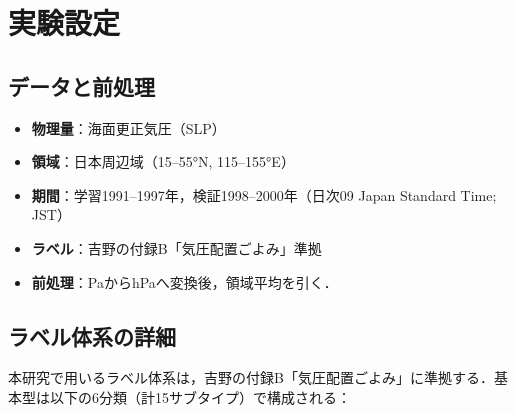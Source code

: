 \documentclass{jarticle}
\theoremstyle{definition}
\begin{document}
\section{実験設定}
\subsection{データと前処理}
\begin{itemize}
\item \textbf{物理量}：海面更正気圧（SLP）
\item \textbf{領域}：日本周辺域（15–55°N, 115–155°E）
\item \textbf{期間}：学習1991–1997年，検証1998–2000年（日次09 Japan Standard Time; JST）
\item \textbf{ラベル}：吉野\cite{吉野2002日本の気候}の付録B「気圧配置ごよみ」準拠
\item \textbf{前処理}：PaからhPaへ変換後，領域平均を引く．
\end{itemize}
\subsection{ラベル体系の詳細}
本研究で用いるラベル体系は，吉野\cite{吉野2002日本の気候}の付録B「気圧配置ごよみ」に準拠する．基本型は以下の6分類（計15サブタイプ）で構成される：
\end{document}
